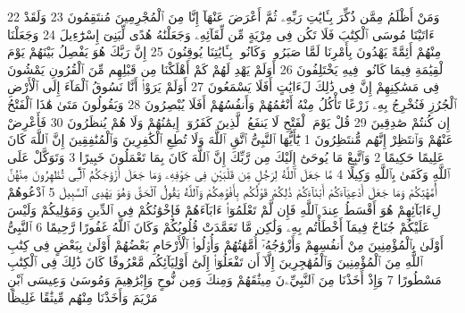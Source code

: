 {\tiny\colorbox{cl_aya}{22}} وَمَنْ أَظْلَمُ مِمَّن ذُكِّرَ بِـَٔايَٰتِ رَبِّهِۦ ثُمَّ أَعْرَضَ عَنْهَآ إِنَّا مِنَ ٱلْمُجْرِمِينَ مُنتَقِمُونَ
{\tiny\colorbox{cl_aya}{23}} وَلَقَدْ ءَاتَيْنَا مُوسَى ٱلْكِتَٰبَ فَلَا تَكُن فِى مِرْيَةٍ مِّن لِّقَآئِهِۦ وَجَعَلْنَٰهُ هُدًى لِّبَنِىٓ إِسْرَٰٓءِيلَ
{\tiny\colorbox{cl_aya}{24}} وَجَعَلْنَا مِنْهُمْ أَئِمَّةً يَهْدُونَ بِأَمْرِنَا لَمَّا صَبَرُوا۟ وَكَانُوا۟ بِـَٔايَٰتِنَا يُوقِنُونَ
{\tiny\colorbox{cl_aya}{25}} إِنَّ رَبَّكَ هُوَ يَفْصِلُ بَيْنَهُمْ يَوْمَ ٱلْقِيَٰمَةِ فِيمَا كَانُوا۟ فِيهِ يَخْتَلِفُونَ
{\tiny\colorbox{cl_aya}{26}} أَوَلَمْ يَهْدِ لَهُمْ كَمْ أَهْلَكْنَا مِن قَبْلِهِم مِّنَ ٱلْقُرُونِ يَمْشُونَ فِى مَسَٰكِنِهِمْ إِنَّ فِى ذَٰلِكَ لَءَايَٰتٍ أَفَلَا يَسْمَعُونَ
{\tiny\colorbox{cl_aya}{27}} أَوَلَمْ يَرَوْا۟ أَنَّا نَسُوقُ ٱلْمَآءَ إِلَى ٱلْأَرْضِ ٱلْجُرُزِ فَنُخْرِجُ بِهِۦ زَرْعًا تَأْكُلُ مِنْهُ أَنْعَٰمُهُمْ وَأَنفُسُهُمْ أَفَلَا يُبْصِرُونَ
{\tiny\colorbox{cl_aya}{28}} وَيَقُولُونَ مَتَىٰ هَٰذَا ٱلْفَتْحُ إِن كُنتُمْ صَٰدِقِينَ
{\tiny\colorbox{cl_aya}{29}} قُلْ يَوْمَ ٱلْفَتْحِ لَا يَنفَعُ ٱلَّذِينَ كَفَرُوٓا۟ إِيمَٰنُهُمْ وَلَا هُمْ يُنظَرُونَ
{\tiny\colorbox{cl_aya}{30}} فَأَعْرِضْ عَنْهُمْ وَٱنتَظِرْ إِنَّهُم مُّنتَظِرُونَ
{\tiny\colorbox{cl_aya}{1}} يَٰٓأَيُّهَا ٱلنَّبِىُّ ٱتَّقِ ٱللَّهَ وَلَا تُطِعِ ٱلْكَٰفِرِينَ وَٱلْمُنَٰفِقِينَ إِنَّ ٱللَّهَ كَانَ عَلِيمًا حَكِيمًا
{\tiny\colorbox{cl_aya}{2}} وَٱتَّبِعْ مَا يُوحَىٰٓ إِلَيْكَ مِن رَّبِّكَ إِنَّ ٱللَّهَ كَانَ بِمَا تَعْمَلُونَ خَبِيرًا
{\tiny\colorbox{cl_aya}{3}} وَتَوَكَّلْ عَلَى ٱللَّهِ وَكَفَىٰ بِٱللَّهِ وَكِيلًا
{\tiny\colorbox{cl_aya}{4}} مَّا جَعَلَ ٱللَّهُ لِرَجُلٍ مِّن قَلْبَيْنِ فِى جَوْفِهِۦ وَمَا جَعَلَ أَزْوَٰجَكُمُ ٱلَّٰٓـِٔى تُظَٰهِرُونَ مِنْهُنَّ أُمَّهَٰتِكُمْ وَمَا جَعَلَ أَدْعِيَآءَكُمْ أَبْنَآءَكُمْ ذَٰلِكُمْ قَوْلُكُم بِأَفْوَٰهِكُمْ وَٱللَّهُ يَقُولُ ٱلْحَقَّ وَهُوَ يَهْدِى ٱلسَّبِيلَ
{\tiny\colorbox{cl_aya}{5}} ٱدْعُوهُمْ لِءَابَآئِهِمْ هُوَ أَقْسَطُ عِندَ ٱللَّهِ فَإِن لَّمْ تَعْلَمُوٓا۟ ءَابَآءَهُمْ فَإِخْوَٰنُكُمْ فِى ٱلدِّينِ وَمَوَٰلِيكُمْ وَلَيْسَ عَلَيْكُمْ جُنَاحٌ فِيمَآ أَخْطَأْتُم بِهِۦ وَلَٰكِن مَّا تَعَمَّدَتْ قُلُوبُكُمْ وَكَانَ ٱللَّهُ غَفُورًا رَّحِيمًا
{\tiny\colorbox{cl_aya}{6}} ٱلنَّبِىُّ أَوْلَىٰ بِٱلْمُؤْمِنِينَ مِنْ أَنفُسِهِمْ وَأَزْوَٰجُهُۥٓ أُمَّهَٰتُهُمْ وَأُو۟لُوا۟ ٱلْأَرْحَامِ بَعْضُهُمْ أَوْلَىٰ بِبَعْضٍ فِى كِتَٰبِ ٱللَّهِ مِنَ ٱلْمُؤْمِنِينَ وَٱلْمُهَٰجِرِينَ إِلَّآ أَن تَفْعَلُوٓا۟ إِلَىٰٓ أَوْلِيَآئِكُم مَّعْرُوفًا كَانَ ذَٰلِكَ فِى ٱلْكِتَٰبِ مَسْطُورًا
{\tiny\colorbox{cl_aya}{7}} وَإِذْ أَخَذْنَا مِنَ ٱلنَّبِيِّۦنَ مِيثَٰقَهُمْ وَمِنكَ وَمِن نُّوحٍ وَإِبْرَٰهِيمَ وَمُوسَىٰ وَعِيسَى ٱبْنِ مَرْيَمَ وَأَخَذْنَا مِنْهُم مِّيثَٰقًا غَلِيظًا
